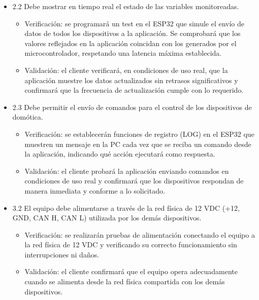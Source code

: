\documentclass[
11pt, %
]{charter}
\begin{document}
\begin{itemize}
\item 2.2 Debe mostrar en tiempo real el estado de las variables monitoreadas.
\begin{itemize}
	\item Verificación: se programará un test en el ESP32 que simule el envío de datos de todos los dispositivos a la aplicación. Se comprobará que los valores reflejados en la aplicación coincidan con los generados por el microcontrolador, respetando una latencia máxima establecida.
	\item Validación: el cliente verificará, en condiciones de uso real, que la aplicación muestre los datos actualizados sin retrasos significativos y confirmará que la frecuencia de actualización cumple con lo requerido.
\end{itemize}

\item 2.3 Debe permitir el envío de comandos para el control de los dispositivos de domótica.
\begin{itemize}
	\item Verificación: se establecerán funciones de registro (LOG) en el ESP32 que muestren un mensaje en la PC cada vez que se reciba un comando desde la aplicación, indicando qué acción ejecutará como respuesta.
	\item Validación: el cliente probará la aplicación enviando comandos en condiciones de uso real y confirmará que los dispositivos respondan de manera inmediata y conforme a lo solicitado.
\end{itemize}

\item 3.2 El equipo debe alimentarse a través de la red física de 12 VDC (+12, GND, CAN H, CAN L) utilizada por los demás dispositivos.
\begin{itemize}
	\item Verificación: se realizarán pruebas de alimentación conectando el equipo a la red física de 12 VDC y verificando su correcto funcionamiento sin interrupciones ni daños.
	\item Validación: el cliente confirmará que el equipo opera adecuadamente cuando se alimenta desde la red física compartida con los demás dispositivos.
\end{itemize}

\end{itemize}
\end{document}
